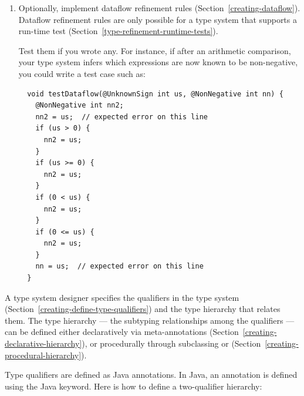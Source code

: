 \begin{enumerate}
\item
  Optionally, implement dataflow refinement rules
  (Section~\ref{creating-dataflow}).
  Dataflow refinement rules are only possible for a type system that
  supports a run-time test (Section~\ref{type-refinement-runtime-tests}).

  Test them if you wrote any.
  For instance, if after an arithmetic comparison, your type system infers
  which expressions are now known to be non-negative, you could write a
  test case such as:

\begin{Verbatim}
  void testDataflow(@UnknownSign int us, @NonNegative int nn) {
    @NonNegative int nn2;
    nn2 = us;  // expected error on this line
    if (us > 0) {
      nn2 = us;
    }
    if (us >= 0) {
      nn2 = us;
    }
    if (0 < us) {
      nn2 = us;
    }
    if (0 <= us) {
      nn2 = us;
    }
    nn = us;  // expected error on this line
  }
\end{Verbatim}

\end{enumerate}





A type system designer specifies the qualifiers in the type system (Section~\ref{creating-define-type-qualifiers})
and
the type hierarchy that relates them.
The type hierarchy --- the subtyping relationships among the qualifiers ---
can be defined either
declaratively via meta-annotations (Section~\ref{creating-declarative-hierarchy}), or procedurally through
subclassing  or
 (Section~\ref{creating-procedural-hierarchy}).




Type qualifiers are defined as Java annotations.  In Java, an
annotation is defined using the Java  keyword.
Here is how to define a two-qualifier hierarchy:

